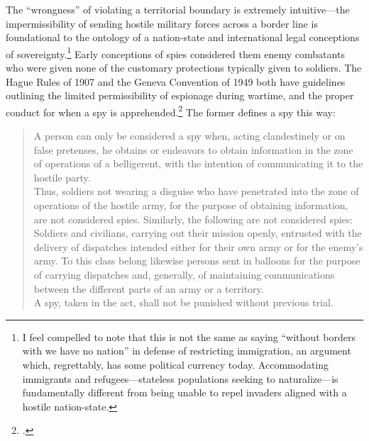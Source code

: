 \documentclass{memoir}
\begin{document}
\begin{refsegment}
The ``wrongness'' of violating a territorial boundary is extremely intuitive---the impermissibility of sending hostile military forces across a border line is foundational to the ontology of a nation-state and international legal conceptions of sovereignty.\footnote{I feel compelled to note that this is not the same as saying ``without borders with we have no nation'' in defense of restricting immigration, an argument which, regrettably, has some political currency today. Accommodating immigrants and refugees---stateless populations seeking to naturalize---is fundamentally different from being unable to repel invaders aligned with a hostile nation-state.} Early conceptions of spies considered them enemy combatants who were given none of the customary protections typically given to soldiers. The Hague Rules of 1907 and the Geneva Convention of 1949 both have guidelines outlining the limited permissibility of espionage during wartime, and the proper conduct for when a spy is apprehended.\footcite[p.~652]{beim_enforcing_2018} The former defines a spy this way:

\begin{quote}
A person can only be considered a spy when, acting clandestinely or on false pretenses, he obtains or endeavors to obtain information in the zone of operations of a belligerent, with the intention of communicating it to the hostile party. \\

Thus, soldiers not wearing a disguise who have penetrated into the zone of operations of the hostile army, for the purpose of obtaining information, are not considered spies. Similarly, the following are not considered spies: Soldiers and civilians, carrying out their mission openly, entrusted with the delivery of dispatches intended either for their own army or for the enemy's army. To this class belong likewise persons sent in balloons for the purpose of carrying dispatches and, generally, of maintaining communications between the different parts of an army or a territory. \\

A spy, taken in the act, shall not be punished without previous trial. \\


\end{quote}
\end{refsegment}
\end{document}
